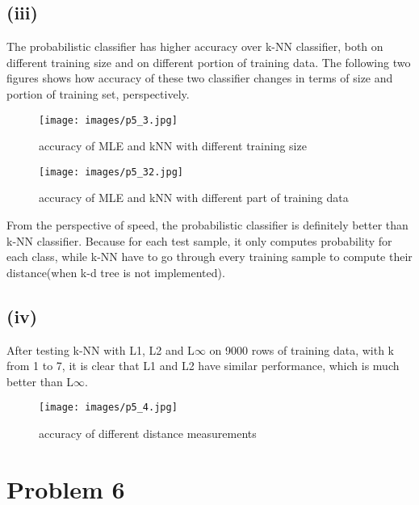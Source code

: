 \documentclass[twoside,11pt]{homework}
\begin{document}
\subsection*{(iii)}
The probabilistic classifier has higher accuracy over k-NN classifier, both on different training size and on different portion of training data. The following two figures shows how accuracy of these two classifier changes in terms of size and portion of training set, perspectively.\\
\begin{figure}[H]
\centering\texttt{[image: images/p5\_3.jpg]}
\caption{accuracy of MLE and kNN with different training size}
\end{figure}
\begin{figure}[H]
\centering\texttt{[image: images/p5\_32.jpg]}
\caption{accuracy of MLE and kNN with different part of training data}
\end{figure}

From the perspective of speed, the probabilistic classifier is definitely better than k-NN classifier. Because for each test sample, it only computes probability for each class, while k-NN have to go through every training sample to compute their distance(when k-d tree is not implemented).
\subsection*{(iv)}
After testing k-NN with L1, L2 and L$\infty$ on 9000 rows of training data, with k from 1 to 7, it is clear that L1 and L2 have similar performance, which is much better than L$\infty$.\\
\begin{figure}[H]
\centering\texttt{[image: images/p5\_4.jpg]}
\caption{accuracy of different distance measurements}
\label{fig:accuracy of different distance measurements}
\end{figure}


\section*{Problem 6}
\end{document}
